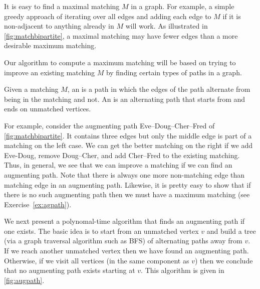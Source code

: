 It is easy to find a maximal matching $M$ in a graph. For example, 
a simple greedy approach of
iterating over all edges and adding each edge to $M$ if it is
non-adjacent to anything already in $M$ will work.  As illustrated in
\cref{fig:matchbipartite}, a maximal matching may have fewer
edges than a more desirable maximum matching.

Our algorithm to compute a maximum matching will be based on
trying to improve an existing matching $M$ by finding certain
types of paths in a graph.

\begin{Definition}
Given a matching $M$, an  is a path in which 
the edges 
of the path alternate from being in the matching and not.
An  is an alternating path that starts from and ends 
on unmatched vertices.
\end{Definition}

For example, consider the augmenting path Eve--Doug--Cher--Fred of
\cref{fig:matchbipartite}.  It contains three edges but only the
middle edge is part of a matching on the left case.  We can get the
better matching on the right if we add Eve-Doug, remove Doug--Cher, and add 
Cher--Fred to the existing matching.  Thus, in general, we see that we can 
improve a matching if we can find an augmenting path.  Note that there is always one
more non-matching edge than matching edge in an augmenting path.
Likewise, it is pretty easy to show that if there is no such augmenting path 
then we must have a maximum matching (see Exercise~\ref{ex:agpath}).

We next present a polynomal-time algorithm that finds an augmenting path if
one exists.  The basic idea is to start from an unmatched vertex $v$
and build a tree (via a graph traversal algorithm such as BFS) 
of alternating paths away from $v$.  If we reach another unmatched vertex 
then we have found an augmenting path.  Otherwise, if we visit all vertices
(in the same component as $v$) then we conclude that no augmenting 
path exists starting at $v$.  This algorithm is given in \cref{fig:augpath}.

